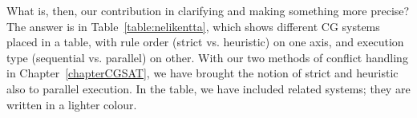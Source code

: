 








What is, then, our contribution in clarifying and making something more precise?
The answer is in Table~\ref{table:nelikentta}, which shows different CG systems 
placed in a table, with rule order (strict vs. heuristic) on one axis, 
and execution type (sequential vs. parallel) on other. 
With our two methods of conflict handling in Chapter~\ref{chapterCGSAT}, 
we have brought the notion of strict and heuristic also to parallel execution. 
In the table, we have included related systems; they are written in a lighter colour.

\def\satcgMax{SAT-CG\textsubscript{Max}}
\def\satcgOrd{SAT-CG\textsubscript{Ord}}
\def\noncg#1{{\color{blue} #1}}

